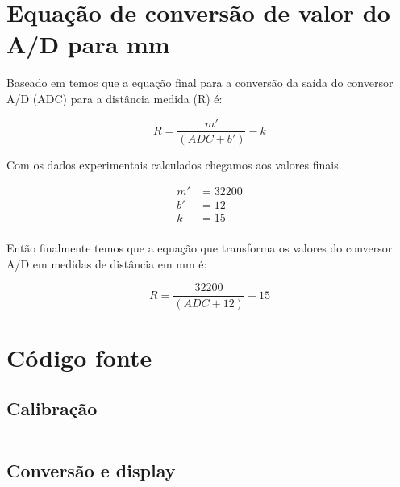\documentclass{article}
\begin{document}
\section{Equação de conversão de valor do A/D para mm}
Baseado em \cite{Acroname_2013} temos que a equação final para a conversão da saída do conversor A/D (ADC) para a distância medida (R) é:

\begin{equation}
    R = \frac{m'}{(ADC+b')} - k
\end{equation}

Com os dados experimentais calculados chegamos aos valores finais.

\begin{align*}
    m'& = 32200\\
    b'& = 12\\
    k& = 15\\
\end{align*}

Então finalmente temos que a equação que transforma os valores do conversor A/D em medidas de distância em mm é:

\begin{equation*}
    R = \frac{32200}{(ADC+12)} - 15
\end{equation*}

\newpage
\section{Código fonte}

\subsection{Calibração}

\inputminted{c}{code/NearCalibration.c}
\newpage
\subsection{Conversão e display}
\inputminted{c}{code/DataDisplay.c}
\newpage

\end{document}
